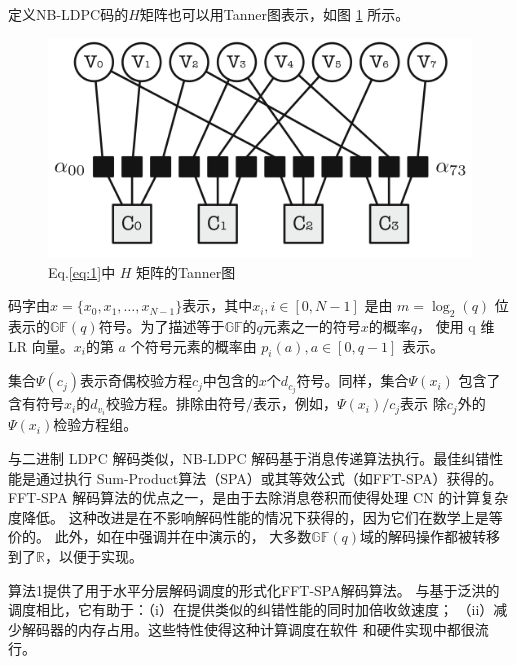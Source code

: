 \documentclass{cjc}
\begin{document}
  定义NB-LDPC码的$H$矩阵也可以用Tanner图表示，如图 \ref{fig:1} 所示。

\begin{figure}[htb]
  \centering
  \includegraphics[width=\linewidth]{assets/fig1.png}
  \caption{Eq.\ref{eq:1}中 $H$ 矩阵的Tanner图}\label{fig:1}
\end{figure}

  码字由$x=\{x_0,x_1,\dots,x_{N-1}\}$表示，其中$x_i,i\in[0,N-1]$ 是由 $m=\log_2(q)$
  位表示的$\mathbb{GF}(q)$符号。为了描述等于$\mathbb{GF}$的$q$元素之一的符号$x$的概率$q$，
  使用 q 维 LR 向量。$x_i$的第 $a$ 个符号元素的概率由 $p_i(a),a\in[0,q-1]$ 表示。

  集合$\Psi(c_j)$表示奇偶校验方程$c_j$中包含的$x$个$d_{c_j}$符号。同样，集合$\Psi(x_i)$
  包含了含有符号$x_i$的$d_{v_i}$校验方程。排除由符号$/$表示，例如，$\Psi(x_i)/c_j$表示
  除$c_j$外的$\Psi(x_i)$检验方程组。

  与二进制 LDPC 解码类似，NB-LDPC 解码基于消息传递算法执行。最佳纠错性能是通过执行
  Sum-Product算法\cite{carrasco_non-binary_2008}（SPA）或其等效公式（如FFT-SPA\cite{carrasco_non-binary_2008}）获得的。
  FFT-SPA 解码算法的优点之一，是由于去除消息卷积而使得处理 CN 的计算复杂度降低。
  这种改进是在不影响解码性能的情况下获得的，因为它们在数学上是等价的\cite{comparison_NBLDPC}。
  此外，如在\cite{noauthor_andrade_nodate}中强调并在\cite{carrasco_non-binary_2008}中演示的，
  大多数$\mathbb{GF}(q)$域的解码操作都被转移到了$\mathbb{R}$，以便于实现。

  算法1提供了用于水平分层解码调度的形式化FFT-SPA解码算法\cite{beermann_gpu_2015,liu_high-throughput_2018,noauthor_hocevar_nodate}。
  与基于泛洪的调度相比，它有助于：（i）在提供类似的纠错性能的同时加倍收敛速度；
  （ii）减少解码器的内存占用。这些特性使得这种计算调度在软件\cite{noauthor_thi_nodate,beermann_gpu_2015,noauthor_pham_nodate,liu_high-throughput_2018}
  和硬件\cite{boutillon_design_2013,abassi_novel_2017}实现中都很流行。
\end{document}
